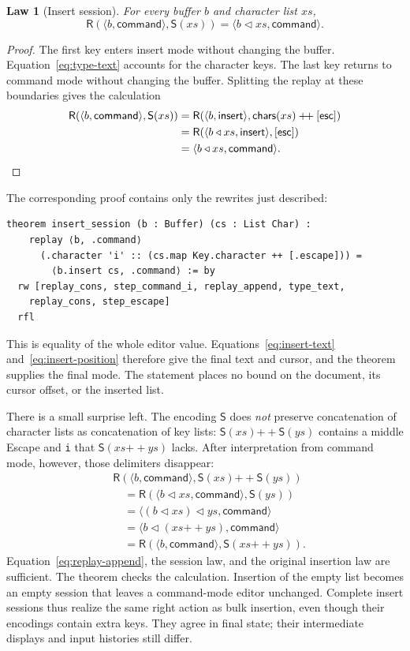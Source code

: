 \documentclass[11pt]{article}
\newcommand{\code}[1]{\texttt{\detokenize{#1}}}
\newcommand{\cat}{\mathbin{+\!+}}
\newcommand{\ins}{\mathbin{\triangleleft}}
\newcommand{\cmd}{\mathsf{command}}
\newcommand{\insertmode}{\mathsf{insert}}
\newcommand{\chars}{\mathsf{chars}}
\newcommand{\esc}{\mathsf{esc}}
\newcommand{\Replay}{\mathsf{R}}
\newcommand{\Session}{\mathsf{S}}
\newtheorem{law}{Law}
\begin{document}
\begin{law}[Insert session]
For every buffer $b$ and character list $xs$,
\begin{equation}
 \Replay(\langle b,\cmd\rangle,\Session(xs))
    =\langle b\ins xs,\cmd\rangle.
 \label{eq:session-law}
\end{equation}
\end{law}
\begin{proof}
The first key enters insert mode without changing the buffer.
Equation~\eqref{eq:type-text} accounts for the character keys. The last key
returns to command mode without changing the buffer. Splitting the replay at
these boundaries gives the calculation
\begin{align*}
 \Replay(\langle b,\cmd\rangle,\Session(xs))
   &=\Replay(\langle b,\insertmode\rangle,\chars(xs)\cat[\esc])\\
   &=\Replay(\langle b\ins xs,\insertmode\rangle,[\esc])\\
   &=\langle b\ins xs,\cmd\rangle.\qedhere
\end{align*}
\end{proof}
\noindent
The corresponding proof contains only the rewrites just described:
\begin{lstlisting}[language=Lean]
theorem insert_session (b : Buffer) (cs : List Char) :
    replay ⟨b, .command⟩
      (.character 'i' :: (cs.map Key.character ++ [.escape])) =
        ⟨b.insert cs, .command⟩ := by
  rw [replay_cons, step_command_i, replay_append, type_text,
    replay_cons, step_escape]
  rfl
\end{lstlisting}
This is equality of the whole editor value. Equations~\eqref{eq:insert-text}
and~\eqref{eq:insert-position} therefore give the final text and cursor,
and the theorem supplies the final mode. The statement places no bound on
the document, its cursor offset, or the inserted list.

There is a small surprise left. The encoding $\Session$ does \emph{not} preserve
concatenation of character lists as concatenation of key lists:
$\Session(xs)\cat\Session(ys)$ contains a middle Escape and \texttt{i} that
$\Session(xs\cat ys)$ lacks. After interpretation from command mode, however,
those delimiters disappear:
\begin{align}
 &\Replay(\langle b,\cmd\rangle,\Session(xs)\cat\Session(ys))\nonumber\\
 &\quad=\Replay(\langle b\ins xs,\cmd\rangle,\Session(ys))\nonumber\\
 &\quad=\langle(b\ins xs)\ins ys,\cmd\rangle\nonumber\\
 &\quad=\langle b\ins(xs\cat ys),\cmd\rangle\nonumber\\
 &\quad=\Replay(\langle b,\cmd\rangle,\Session(xs\cat ys)).
 \label{eq:fusion}
\end{align}
Equation~\eqref{eq:replay-append}, the session law, and the original insertion
law are sufficient. The theorem \code{insert_sessions} checks the calculation.
Insertion of the empty list becomes an empty session that leaves a command-mode
editor unchanged. Complete insert sessions thus realize the same right action
as bulk insertion, even though their encodings contain extra keys. They agree
in final state; their intermediate displays and input histories still differ.
\end{document}
